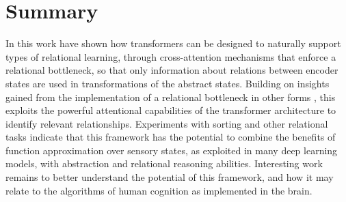 \section{Summary}
\label{sec:discuss}



In this work have shown how transformers
can be designed to
%
naturally support types of relational learning, through cross-attention
mechanisms that enforce a relational bottleneck, so that only information about relations between encoder states
are used in transformations of the abstract states.
Building on insights gained from the implementation of a relational bottleneck in other forms \citep{esbn, kerg2022neural}, this exploits the powerful attentional capabilities of the transformer architecture to identify relevant relationships.
Experiments with sorting and other relational tasks indicate that this framework has the potential to combine the benefits of function approximation over sensory states, as exploited in many deep learning models, with abstraction and relational reasoning abilities. Interesting
work remains to better understand the potential of this framework, and
how it may relate to the algorithms of human cognition as implemented in the brain.


